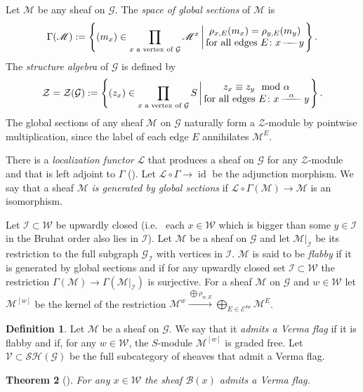 \documentclass[12pt]{amsart}
\newtheorem{theorem}{Theorem}[section]
\theoremstyle{definition}
\newtheorem{definition}[theorem]{Definition}
\theoremstyle{remark}
\newcommand{\CE}{{\mathcal E}}
\newcommand{\CG}{{\mathcal G}}
\newcommand{\CI}{{\mathcal I}}
\newcommand{\CV}{{\mathcal V}}
\newcommand{\CW}{{\mathcal W}}
\newcommand{\CZ}{{\mathcal Z}}
\newcommand{\SB}{{\mathscr B}}
\newcommand{\SL}{{\mathscr L}}
\newcommand{\SM}{{\mathscr M}}
\newcommand{\id}{{\operatorname{id}}}
\newcommand{\Sh}{{\mathcal{SH}}}
\newcommand{\Loc}{{\SL}}
\newcommand{\linie}{{\,\text{---\!\!\!---}\,}}
\newcommand{\llinie}{{\text{---\!\!\!---\!\!\!---}}}
\begin{document}
Let $\SM$ be any sheaf on $\CG$. The {\em space of global sections} of $\SM$ is
$$
\Gamma(\SM):=
\left\{ 
(m_x)\in\prod_{\text{$x$ a vertex of $\CG$}}  \SM^x\left| \,
\begin{matrix}
\rho_{x,E}(m_x)=\rho_{y,E}(m_{y}) \\
\text{for all edges $E\colon x\linie y$}
\end{matrix}
\right.
\right\}.
$$
The {\em structure algebra} of $\CG$ is defined by 
$$
\CZ=\CZ(\CG):=\left\{ 
(z_x)\in\prod_{\text{$x$ a vertex of $\CG$}}  S\left| \,
\begin{matrix}
z_x\equiv z_y\mod \alpha  \\
\text{for all edges $E\colon x\stackrel{\alpha}\llinie y$}
\end{matrix}
\right.
\right\}.
$$
The global sections of any sheaf $\SM$ on $\CG$ naturally form a $\CZ$-module by pointwise multiplication, since the label of each edge $E$ annihilates $\SM^E$.

There is a {\em localization functor} $\Loc$ that produces a sheaf on $\CG$ for any $\CZ$-module and that is left adjoint to $\Gamma$ (\cite{Fie1}). Let $\Loc\circ\Gamma\to \id$ be the adjunction morphism. We say that a sheaf $\SM$ {\em is generated by global sections} if $\Loc\circ\Gamma(\SM)\to\SM$ is an isomorphism.

Let $\CI\subset \CW$ be upwardly closed (i.e.~ each $x\in\CW$ which is bigger than some $y\in\CI$ in the Bruhat order also lies in $\CI$). Let $\SM$ be a sheaf on $\CG$ and let $\SM|_\CI$ be its restriction to the full subgraph $\CG_\CI$ with vertices in $\CI$. $\SM$ is said to be {\em flabby} if it is generated by global sections and if for any upwardly closed set $\CI\subset\CW$ the restriction $\Gamma(\SM)\to\Gamma(\SM|_\CI)$ is surjective. For a sheaf $\SM$ on $\CG$ and $w\in\CW$ let $\SM^{[w]}$ be the kernel of the restriction $\SM^w\stackrel{\bigoplus\rho_{w,E}}\longrightarrow\bigoplus_{E\in\CE^{\delta w}} \SM^E$. 


\begin{definition} Let $\SM$ be a sheaf on $\CG$. We say that it {\em admits a Verma flag} if it is flabby and if, for any $w\in\CW$, the $S$-module $\SM^{[w]}$ is graded free. Let $\CV\subset\Sh(\CG)$ be the full subcategory of sheaves that admit a Verma flag. 
\end{definition}

\begin{theorem}[\cite{Fie2}] For any $x\in\CW$ the sheaf $\SB(x)$ admits a Verma flag.
\end{theorem}
\end{document}
